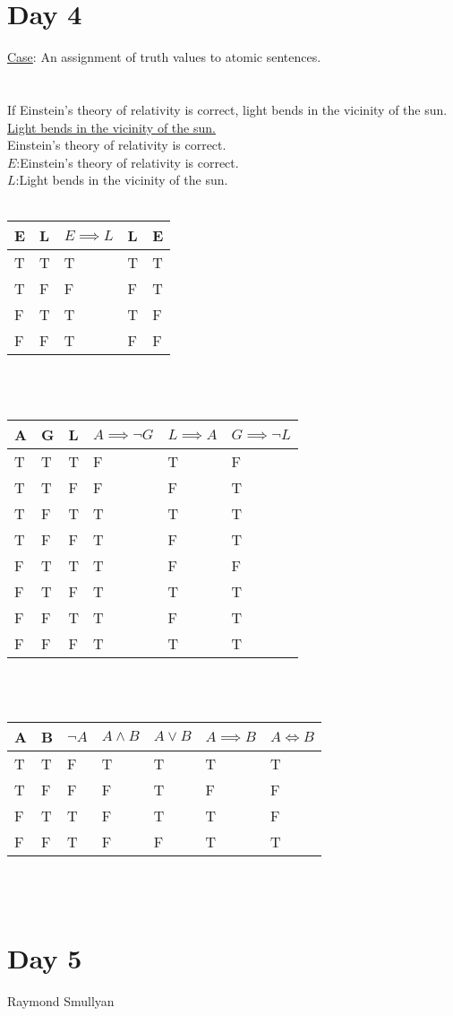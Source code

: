 \documentclass{article}
\begin{document}
\section{Day 4}
\underline{Case}: An assignment of truth values to atomic sentences.\\
\\
\\If Einstein's theory of relativity is correct, light bends in the vicinity of the sun.
\\\underline{Light bends in the vicinity of the sun.}
\\Einstein's theory of relativity is correct.
\\
$E$:Einstein's theory of relativity is correct.\\
$L$:Light bends in the vicinity of the sun.\\
\\
\begin{tabular}{l | l || l | l || l}
	E & L & $E \implies L$ & L & E\\ \hline
	T & T & T & T & T\\
	T & F & F & F & T\\
	F & T & T & T & F\\
	F & F & T & F & F\\
\end{tabular}\\
\\
\begin{tabular}{l | l | l || l | l || l}
	A & G & L & $A \implies \lnot G$ & $L \implies A$ & $G \implies \lnot L$\\ \hline
	T & T & T & F & T & F\\
	T & T & F & F & F & T\\
	T & F & T & T & T & T\\
	T & F & F & T & F & T\\
	F & T & T & T & F & F\\
	F & T & F & T & T & T\\
	F & F & T & T & F & T\\
	F & F & F & T & T & T\\
\end{tabular}\\
\\
\begin{tabular}{l | l || l | l | l | l | l}
	A & B & $\lnot A$ & $A \land B$ & $A \lor B$ & $A \implies B$ & $A \iff B$\\ \hline
	T & T & F & T & T & T & T\\
	T & F & F & F & T & F & F\\
	F & T & T & F & T & T & F\\
	F & F & T & F & F & T & T\\
\end{tabular}\\
\\
\section{Day 5}
Raymond Smullyan\\
\end{document}
